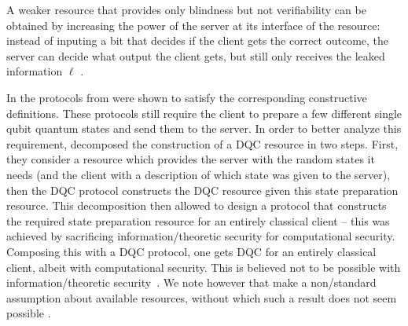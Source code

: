 A weaker resource that provides only blindness but not verifiability
can be obtained by increasing the power of the server at its interface
of the resource: instead of inputing a bit that decides if the client
gets the correct outcome, the server can decide what output the client
gets, but still only receives the leaked information $\ell$
\cite{DFPR14}.

In \textcite{DFPR14} the protocols from \textcite{BFK09,FK17} were
shown to satisfy the corresponding constructive definitions. These
protocols still require the client to prepare a few different single
qubit quantum states and send them to the server. In order to better
analyze this requirement, \textcite{DK16} decomposed the construction
of a DQC resource in two steps. First, they consider a resource which
provides the server with the random states it needs (and the client
with a description of which state was given to the server), then the
DQC protocol constructs the DQC resource given this state preparation
resource. This decomposition then allowed \textcite{GV19} to design a
protocol that constructs the required state preparation resource for
an entirely classical client \--- this was achieved by sacrificing
information\-/theoretic security for computational security. Composing
this with a DQC protocol, one gets DQC for an entirely classical
client, albeit with computational security. This is believed not to be
possible with information\-/theoretic security~\cite{ACGK19}. We note
however that \textcite{GV19} make a non\-/standard assumption about
available resources, without which such a result does not seem
possible \cite{BCCKLMW20}.

